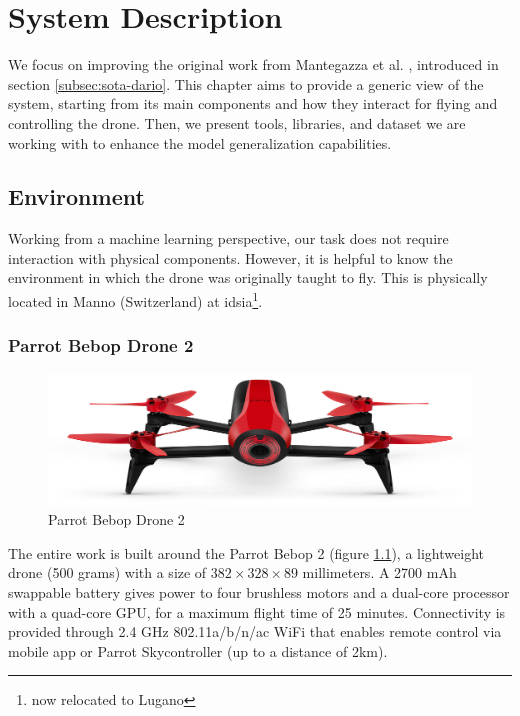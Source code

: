 \chapter{System Description}
\label{chap:system}


We focus on improving the original work from Mantegazza et al. \cite{mantegazza2019visionbased}, introduced in section \ref{subsec:sota-dario}. This chapter aims to provide a generic view of the system, starting from its main components and how they interact for flying and controlling the drone. Then, we present tools, libraries, and dataset we are working with to enhance the model generalization capabilities.




\section{Environment}
\label{sec:hardware}

Working from a machine learning perspective, our task does not require interaction with physical components. However, it is helpful to know the environment in which the drone was originally taught to fly. This is physically located in Manno (Switzerland) at \gls{idsia}\footnote{now relocated to Lugano}.



\subsection{Parrot Bebop Drone 2}
\label{subsec:bebop}

\begin{figure}[!htb]
	\centering
	\includegraphics[width=.8\textwidth]{"contents/images/03-Parrot-Bebop-2"}
	\caption[Parrot Bebop Drone 2]{Parrot Bebop Drone 2}
	\label{fig:bebop}
\end{figure}

The entire work is built around the Parrot Bebop 2 \cite{bebop} (figure \ref{fig:bebop}), a lightweight drone (500 grams) with a size of $382 \times 328 \times 89$ millimeters. A 2700 mAh swappable battery gives power to four brushless motors and a dual-core processor with a quad-core GPU, for a maximum flight time of 25 minutes. Connectivity is provided through 2.4 GHz 802.11a/b/n/ac WiFi that enables remote control via mobile app or Parrot Skycontroller (up to a distance of 2km).

